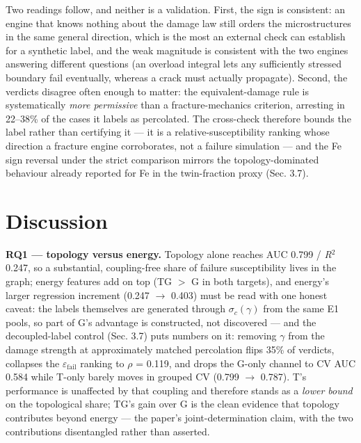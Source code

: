 \documentclass[11pt]{article}
\begin{document}
Two readings follow, and neither is a validation. First, the sign is consistent: an engine that knows nothing about the damage law still orders the microstructures in the same general direction, which is the most an external check can establish for a synthetic label, and the weak magnitude is consistent with the two engines answering different questions (an overload integral lets any sufficiently stressed boundary fail eventually, whereas a crack must actually propagate). Second, the verdicts disagree often enough to matter: the equivalent-damage rule is systematically \textit{more permissive} than a fracture-mechanics criterion, arresting in 22--38\% of the cases it labels as percolated. The cross-check therefore bounds the label rather than certifying it --- it is a relative-susceptibility ranking whose direction a fracture engine corroborates, not a failure simulation --- and the Fe sign reversal under the strict comparison mirrors the topology-dominated behaviour already reported for Fe in the twin-fraction proxy (Sec. 3.7).

\section{Discussion}

\textbf{RQ1 --- topology versus energy.} Topology alone reaches AUC 0.799 / \textit{R}$^{2}$ 0.247, so a substantial, coupling-free share of failure susceptibility lives in the graph; energy features add on top (TG $>$ G in both targets), and energy's larger regression increment (0.247 $\rightarrow$ 0.403) must be read with one honest caveat: the labels themselves are generated through $\sigma_{c}(\gamma)$ from the same E1 pools, so part of G's advantage is constructed, not discovered --- and the decoupled-label control (Sec. 3.7) puts numbers on it: removing $\gamma$ from the damage strength at approximately matched percolation flips 35\% of verdicts, collapses the $\varepsilon_{\mathrm{fail}}$ ranking to $\rho$ = 0.119, and drops the G-only channel to CV AUC 0.584 while T-only barely moves in grouped CV (0.799 $\rightarrow$ 0.787). T's performance is unaffected by that coupling and therefore stands as a \textit{lower bound} on the topological share; TG's gain over G is the clean evidence that topology contributes beyond energy --- the paper's joint-determination claim, with the two contributions disentangled rather than asserted.
\end{document}
